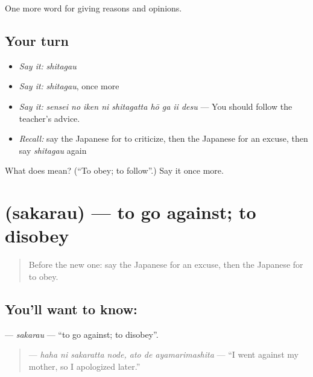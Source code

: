 \begin{grammarlens}[title={What you've built}]
One more word for giving reasons and opinions.
\end{grammarlens}

\subsection*{Your turn}
\begin{itemize}
\raggedright
  \item \emph{Say it:} \emph{shitagau}
  \item \emph{Say it:} \emph{shitagau}, once more
  \item \emph{Say it:} \emph{sensei no iken ni shitagatta hō ga ii desu} — You should follow the teacher's advice.
  \item \emph{Recall:} say the Japanese for to criticize, then the Japanese for an excuse, then say \emph{shitagau} again
\end{itemize}

\begin{tcolorbox}[breakable,colback=teal!4,colframe=teal!35!black,title={Before you move on}]
What does  mean? (\textquotedblleft{}To obey; to follow\textquotedblright{}.) Say it once more.
\end{tcolorbox}
\section[\texorpdfstring{\ja{さからう} (sakarau)}{さからう (sakarau)}]{ (sakarau) — to go against; to disobey}

\label{lesson:JA-C325-sakarau}



\begin{quote}
Before the new one: say the Japanese for an excuse, then the Japanese for to obey.
\end{quote}

\subsection*{You'll want to know: }
\textbf{} — \emph{sakarau} — \textquotedblleft{}to go against; to disobey\textquotedblright{}.

\begin{quote}
\textbf{  } — \emph{haha ni sakaratta node, ato de ayamarimashita} — \textquotedblleft{}I went against my mother, so I apologized later.\textquotedblright{}
\end{quote}


